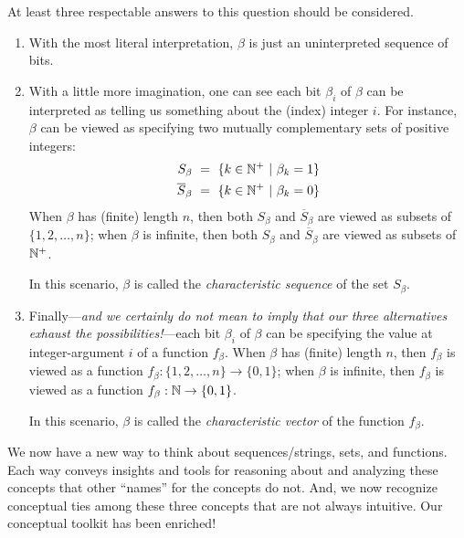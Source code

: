 \noindent
At least three respectable answers to this question should be
considered.
\begin{enumerate}
\item
With the most literal interpretation, $\beta$ is just an uninterpreted
sequence of bits.

\item
With a little more imagination, one can see each bit $\beta_i$ of
$\beta$ can be interpreted as telling us something about the (index)
integer $i$.  For instance, $\beta$ can be viewed as specifying two
mutually complementary sets of positive integers:
\begin{eqnarray*}
S_\beta \ = \ \{ k \in \mathbb{N}^+ \ | \ \beta_k = 1\} \\
\overline{S}_\beta \ = \ \{ k \in \mathbb{N}^+ \ | \ \beta_k = 0\} \\
\end{eqnarray*}
When $\beta$ has (finite) length $n$, then both $S_\beta$ and
$\overline{S}_\beta$ are viewed as subsets of $\{1, 2, \ldots, n\}$;
when $\beta$ is infinite, then both $S_\beta$ and $\overline{S}_\beta$
are viewed as subsets of $\mathbb{N}^+$.

In this scenario, $\beta$ is called the {\it characteristic sequence}
of the set $S_\beta$.

\item
Finally---{\em and we certainly do not mean to imply that our three
  alternatives exhaust the possibilities!}---each bit $\beta_i$ of
$\beta$ can be specifying the value at integer-argument $i$ of a
function $f_\beta$.  When $\beta$ has (finite) length $n$, then
$f_\beta$ is viewed as a function $f_\beta: \{1, 2, \ldots, n\}
\rightarrow \{0,1\}$; when $\beta$ is infinite, then $f_\beta$ is
viewed as a function $f_\beta: \mathbb{N} \rightarrow \{0,1\}$.

In this scenario, $\beta$ is called the {\it characteristic vector}
of the function $f_\beta$.
\end{enumerate}

We now have a new way to think about sequences/strings, sets, and
functions.  Each way conveys insights and tools for reasoning about
and analyzing these concepts that other ``names'' for the concepts do
not.  And, we now recognize conceptual ties among these three concepts
that are not always intuitive.  Our conceptual toolkit has been
enriched!

